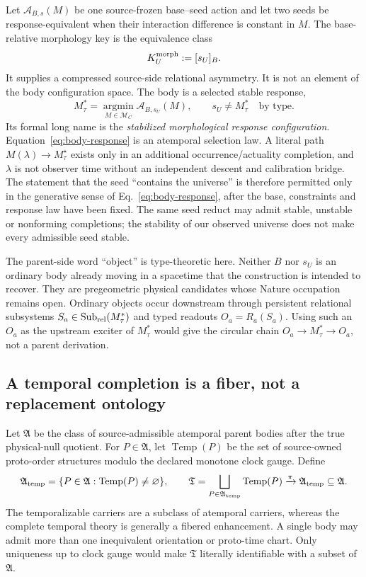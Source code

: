 \documentclass[11pt]{article}
\newcommand{\At}{\mathfrak A}
\newcommand{\Temp}{\operatorname{Temp}}
\begin{document}
Let \(\mathcal A_{B,s}(M)\) be one source-frozen base--seed action and let two
seeds be response-equivalent when their interaction difference is constant in
\(M\).  The base-relative morphology key is the equivalence class
\begin{equation}
 K_U^{\rm morph}:=[s_U]_B.
 \label{eq:seed-key}
\end{equation}
It supplies a compressed source-side relational asymmetry.  It is not an
element of the body configuration space.  The body is a selected stable
response,
\begin{equation}
 M_\tau^*=\operatorname*{argmin}_{M\in\mathcal M_C}
 \mathcal A_{B,s_U}(M),
 \qquad s_U\ne M_\tau^*\quad\text{by type}.
 \label{eq:body-response}
\end{equation}
Its formal long name is the \emph{stabilized morphological response
configuration}.  Equation~\eqref{eq:body-response} is an atemporal selection
law.  A literal path $M(\lambda)\to M_\tau^\star$ exists only in an additional
occurrence/actuality completion, and $\lambda$ is not observer time without an
independent descent and calibration bridge.
The statement that the seed ``contains the universe'' is therefore permitted
only in the generative sense of Eq.~\eqref{eq:body-response}, after the base,
constraints and response law have been fixed.  The same seed reduct may admit
stable, unstable or nonforming completions; the stability of our observed
universe does not make every admissible seed stable.

The parent-side word ``object'' is type-theoretic here. Neither \(B\) nor
\(s_U\) is an ordinary body already moving in a spacetime that the construction
is intended to recover. They are pregeometric physical candidates whose
Nature occupation remains open. Ordinary objects occur downstream through
persistent relational subsystems
\(S_a\in\operatorname{Sub}_{\rm rel}(M_\tau^*)\) and typed readouts
\(O_a=R_a(S_a)\).
Using such an \(O_a\) as the upstream exciter of \(M_\tau^*\) would give the
circular chain \(O_a\to M_\tau^*\to O_a\), not a parent derivation.

\subsection{A temporal completion is a fiber, not a replacement ontology}

Let \(\At\) be the class of source-admissible atemporal parent bodies after
the true physical-null quotient.  For \(P\in\At\), let \(\Temp(P)\) be the
set of source-owned proto-order structures modulo the declared monotone clock
gauge.  Define
\begin{equation}
 \At_{\rm temp}=\{P\in\At:\Temp(P)\ne\varnothing\},
 \qquad
 \mathfrak T=\bigsqcup_{P\in\At_{\rm temp}}\Temp(P)
 \xrightarrow{\pi}\At_{\rm temp}\subseteq\At.
 \label{eq:temporalization-fiber}
\end{equation}
The temporalizable carriers are a subclass of atemporal carriers, whereas
the complete temporal theory is generally a fibered enhancement.  A single
body may admit more than one inequivalent orientation or proto-time chart.
Only uniqueness up to clock gauge would make \(\mathfrak T\) literally
identifiable with a subset of \(\At\).
\end{document}
